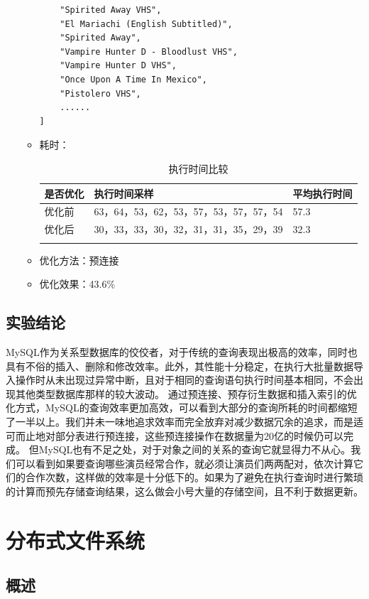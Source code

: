 \documentclass{ctexrep}
\begin{document}
\begin{enumerate}
\begin{itemize}
\begin{lstlisting}
    "Spirited Away VHS",
    "El Mariachi (English Subtitled)",
    "Spirited Away",
    "Vampire Hunter D - Bloodlust VHS",
    "Vampire Hunter D VHS",
    "Once Upon A Time In Mexico",
    "Pistolero VHS",
    ......
]
    	                \end{lstlisting}
    	            \item 耗时：
    	                \begin{longtable}{l|p{5cm}|l}
    	                    \hline
    	                    是否优化 & 执行时间采样 & 平均执行时间\\
    	                    \hline
    	                    \hline
    	                    优化前 & 63，64，53，62，53，57，53，57，57，54 & 57.3\\
    	                    优化后 & 30，33，33，30，32，31，31，35，29，39 & 32.3\\
    	                    \hline
    	                    \caption{执行时间比较}
    	                \end{longtable}
    	            \item 优化方法：预连接
    	            \item 优化效果：43.6\%
    	        \end{itemize}
	    \end{enumerate}
	\subsection{实验结论}
	MySQL作为关系型数据库的佼佼者，对于传统的查询表现出极高的效率，同时也具有不俗的插入、删除和修改效率。此外，其性能十分稳定，在执行大批量数据导入操作时从未出现过异常中断，且对于相同的查询语句执行时间基本相同，不会出现其他类型数据库那样的较大波动。
    通过预连接、预存衍生数据和插入索引的优化方式，MySQL的查询效率更加高效，可以看到大部分的查询所耗的时间都缩短了一半以上。我们并未一味地追求效率而完全放弃对减少数据冗余的追求，而是适可而止地对部分表进行预连接，这些预连接操作在数据量为20亿的时候仍可以完成。
    但MySQL也有不足之处，对于对象之间的关系的查询它就显得力不从心。我们可以看到如果要查询哪些演员经常合作，就必须让演员们两两配对，依次计算它们的合作次数，这样做的效率是十分低下的。如果为了避免在执行查询时进行繁琐的计算而预先存储查询结果，这么做会小号大量的存储空间，且不利于数据更新。
	
	\section{分布式文件系统}
	\subsection{概述}
\end{document}
